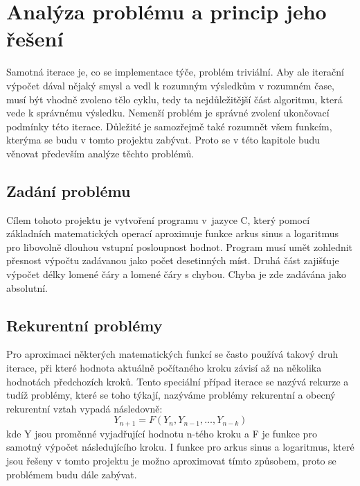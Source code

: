 \documentclass[12pt,a4paper,titlepage,final]{article}
\begin{document}
\section{Analýza problému a princip jeho řešení} \label{analyza}

Samotná iterace je, co se implementace týče, problém triviální. Aby ale
iterační výpočet dával nějaký smysl a vedl k rozumným výsledkům v rozumném
čase, musí být vhodně zvoleno tělo  cyklu, tedy ta nejdůležitější část algoritmu,
která vede k správnému výsledku. Nemenší problém je správné zvolení ukončovací
podmínky této iterace. Důležité je samozřejmě také rozumnět všem funkcím,
kterýma se budu v tomto projektu zabývat. Proto se v této kapitole budu věnovat
především analýze těchto problémů.

\subsection{Zadání problému}

Cílem tohoto projektu je vytvoření programu v~jazyce C, který pomocí základních
matematických operací aproximuje funkce arkus sinus a logaritmus pro libovolně
dlouhou vstupní posloupnost hodnot. Program musí umět zohlednit přesnost výpočtu
zadávanou jako počet desetinných míst. Druhá část zajišťuje výpočet délky lomené
čáry a lomené čáry s chybou. Chyba je zde zadávána jako absolutní.

\subsection{Rekurentní problémy}

Pro aproximaci některých matematických funkcí se často používá
takový druh iterace, při které hodnota aktuálně počítaného kroku závisí až na
několika hodnotách předchozích kroků. Tento speciální případ iterace se nazývá
rekurze a tudíž problémy, které se toho týkají, nazýváme problémy rekurentní
a obecný rekurentní vztah \cite{opora} vypadá následovně:
\begin{equation}\label{eq:rekurentni_vztah}
Y_{n+1} = F(Y_{n}, Y_{n-1}, \dots, Y_{n-k})
\end{equation}
kde Y jsou proměnné vyjadřující hodnotu n-tého kroku a F je funkce pro samotný
výpočet následujícího kroku.
I funkce pro arkus sinus a logaritmus, které jsou řešeny v tomto projektu je možno
aproximovat tímto způsobem, proto se problémem budu dále zabývat.
\end{document}

